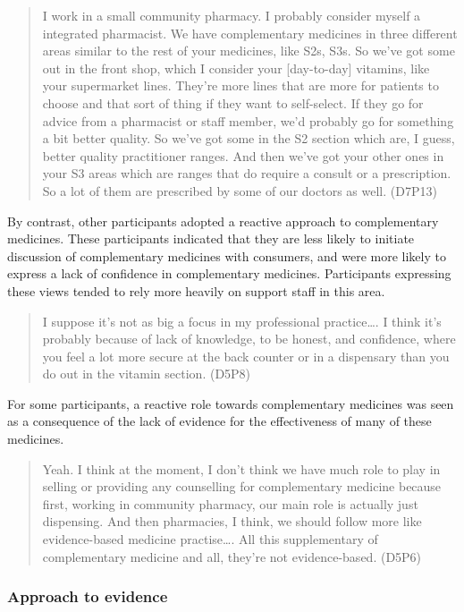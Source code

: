 \documentclass[12pt,]{article}
\begin{document}
\begin{quote}
I work in a small community pharmacy. I probably consider myself a
integrated pharmacist. We have complementary medicines in three
different areas similar to the rest of your medicines, like S2s, S3s. So
we've got some out in the front shop, which I consider your
{[}day-to-day{]} vitamins, like your supermarket lines. They're more
lines that are more for patients to choose and that sort of thing if
they want to self-select. If they go for advice from a pharmacist or
staff member, we'd probably go for something a bit better quality. So
we've got some in the S2 section which are, I guess, better quality
practitioner ranges. And then we've got your other ones in your S3 areas
which are ranges that do require a consult or a prescription. So a lot
of them are prescribed by some of our doctors as well. (D7P13)
\end{quote}

By contrast, other participants adopted a reactive approach to
complementary medicines. These participants indicated that they are less
likely to initiate discussion of complementary medicines with consumers,
and were more likely to express a lack of confidence in complementary
medicines. Participants expressing these views tended to rely more
heavily on support staff in this area.

\begin{quote}
I suppose it's not as big a focus in my professional practice\ldots{}. I
think it's probably because of lack of knowledge, to be honest, and
confidence, where you feel a lot more secure at the back counter or in a
dispensary than you do out in the vitamin section. (D5P8)
\end{quote}

For some participants, a reactive role towards complementary medicines
was seen as a consequence of the lack of evidence for the effectiveness
of many of these medicines.

\begin{quote}
Yeah. I think at the moment, I don't think we have much role to play in
selling or providing any counselling for complementary medicine because
first, working in community pharmacy, our main role is actually just
dispensing. And then pharmacies, I think, we should follow more like
evidence-based medicine practise\ldots{}. All this supplementary of
complementary medicine and all, they're not evidence-based. (D5P6)
\end{quote}

\subsubsection{Approach to evidence}\label{approach-to-evidence}
\end{document}
